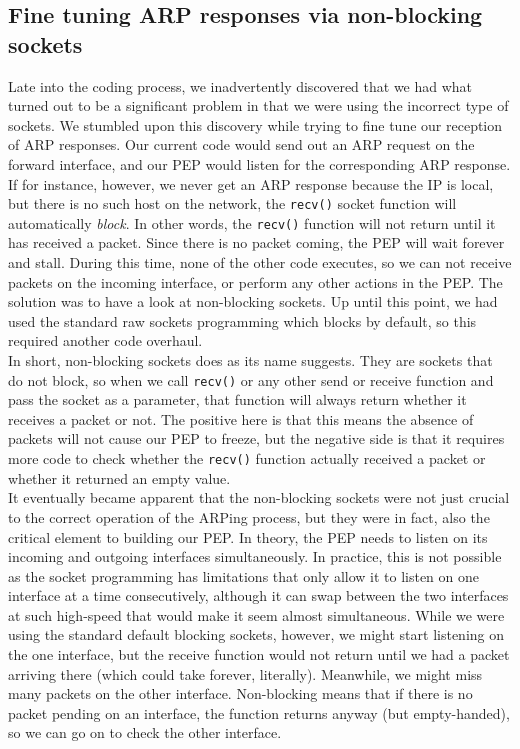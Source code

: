 \documentclass{uathesis}
\begin{document}
\begin{appendices}
\subsection{Fine tuning ARP responses via non-blocking sockets}

Late into the coding process, we inadvertently discovered that we had what turned out to be a significant problem in that we were using the incorrect type of sockets. We stumbled upon this discovery while trying to fine tune our reception of ARP responses. Our current code would send out an ARP request on the forward interface, and our PEP would listen for the corresponding ARP response. If for instance, however, we never get an ARP response because the IP is local, but there is no such host on the network, the {\tt recv()} socket function will automatically \emph{block}. In other words, the {\tt recv()} function will not return until it has received a packet. Since there is no packet coming, the PEP will wait forever and stall. During this time, none of the other code executes, so we can not receive packets on the incoming interface, or perform any other actions in the PEP. The solution was to have a look at non-blocking sockets. Up until this point, we had used the standard raw sockets programming which blocks by default, so this required another code overhaul. \\

In short, non-blocking sockets does as its name suggests. They are sockets that do not block, so when we call {\tt recv()} or any other send or receive function and pass the socket as a parameter, that function will always return whether it receives a packet or not. The positive here is that this means the absence of packets will not cause our PEP to freeze, but the negative side is that it requires more code to check whether the {\tt recv()} function actually received a packet or whether it returned an empty value. \\

It eventually became apparent that the non-blocking sockets were not just crucial to the correct operation of the ARPing process, but they were in fact, also the critical element to building our PEP. In theory, the PEP needs to listen on its incoming and outgoing interfaces simultaneously. In practice, this is not possible as the socket programming has limitations that only allow it to listen on one interface at a time consecutively, although it can swap between the two interfaces at such high-speed that would make it seem almost simultaneous. While we were using the standard default blocking sockets, however, we might start listening on the one interface, but the receive function would not return until we had a packet arriving there (which could take forever, literally). Meanwhile, we might miss many packets on the other interface. Non-blocking means that if there is no packet pending on an interface, the function returns anyway (but empty-handed), so we can go on to check the other interface.


\end{appendices}
\end{document}
